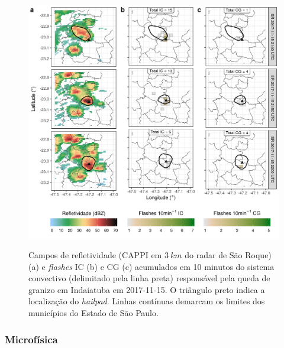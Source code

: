 \newpage

\begin{figure}[htb]
	\centering
	\caption{Campos de refletividade (CAPPI em $3\:km$ do radar de São Roque) (a) e \textit{flashes} IC (b) e CG (c) acumulados em 10 minutos do sistema convectivo (delimitado pela linha preta) responsável pela queda de granizo em Indaiatuba em 2017-11-15. O triângulo preto indica a localização do \textit{hailpad}. Linhas contínuas demarcam os limites dos municípios do Estado de São Paulo.} 
	\label{dbz_flashes_20171115}
	\includegraphics[width=0.99\columnwidth]{../General_Processing/figures/clusters_flashes_2017-11-15_2150_ptbr.png} \\
\end{figure}

\subsubsection{Microfísica}\label{micro_20171115}

